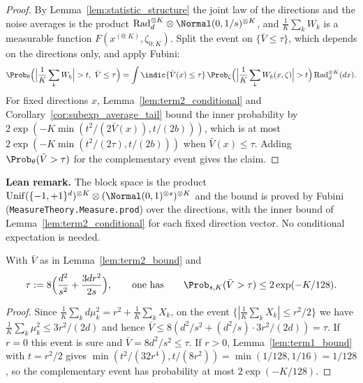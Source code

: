 \begin{proof}
\leanok
{}
By Lemma~\ref{lem:statistic_structure} the joint law of the directions and the noise
averages is the product $\mathrm{Rad}_d^{\otimes K} \otimes \Normal(0,1/s)^{\otimes K}$, and
$\frac1K\sum_k W_k$ is a measurable function $F(x^{(0:K)}, \zeta_{0:K})$. Split the event on
$\{\bar V \le \tau\}$, which depends on the directions only, and apply Fubini:
\[
  \Prob_\theta\Big(\Big|\frac1K\sum_k W_k\Big| > t,\ \bar V \le \tau\Big)
  = \int \indic\{\bar V(x) \le \tau\}\,
    \Prob_\zeta\Big( \Big| \frac1K\sum_k W_k(x, \zeta) \Big| > t \Big)\,
    \mathrm{Rad}_d^{\otimes K}(dx) .
\]
For fixed directions $x$, Lemma~\ref{lem:term2_conditional} and
Corollary~\ref{cor:subexp_average_tail} bound the inner probability by
$2\exp(-K\min(t^2/(2\bar V(x)), t/(2b)))$, which is at most
$2\exp(-K\min(t^2/(2\tau), t/(2b)))$ when $\bar V(x) \le \tau$. Adding
$\Prob_\theta(\bar V > \tau)$ for the complementary event gives the claim.
\end{proof}

\textbf{Lean remark.} The block space is the product
$\mathrm{Unif}(\{-1,+1\}^d)^{\otimes K} \otimes (\Normal(0,1)^{\otimes s})^{\otimes K}$ and the
bound is proved by Fubini (\texttt{MeasureTheory.Measure.prod}) over the directions, with
the inner bound of Lemma~\ref{lem:term2_conditional} for each fixed direction vector. No
conditional expectation is needed.

\begin{lemma}\label{lem:vbar_bound}
\leanok
{}
With $\bar V$ as in Lemma~\ref{lem:term2_bound} and
\[
  \tau := 8\Big( \frac{d^2}{s^2} + \frac{3 d r^2}{2 s} \Big),
  \qquad\text{one has}\qquad
  \Prob_{s,K}(\bar V > \tau) \le 2\exp(-K/128) .
\]
\end{lemma}

\begin{proof}
\leanok
{}
Since $\frac1K\sum_k d\mu_k^2 = r^2 + \frac1K\sum_k X_k$, on the event
$\{|\frac1K\sum_k X_k| \le r^2/2\}$ we have $\frac1K\sum_k\mu_k^2 \le 3r^2/(2d)$ and hence
$\bar V \le 8(d^2/s^2 + (d^2/s)\cdot 3r^2/(2d)) = \tau$. If $r = 0$ this event is sure and
$\bar V = 8d^2/s^2 \le \tau$. If $r > 0$, Lemma~\ref{lem:term1_bound} with $t = r^2/2$ gives
$\min(t^2/(32r^4), t/(8r^2)) = \min(1/128, 1/16) = 1/128$, so the complementary event has
probability at most $2\exp(-K/128)$.
\end{proof}

